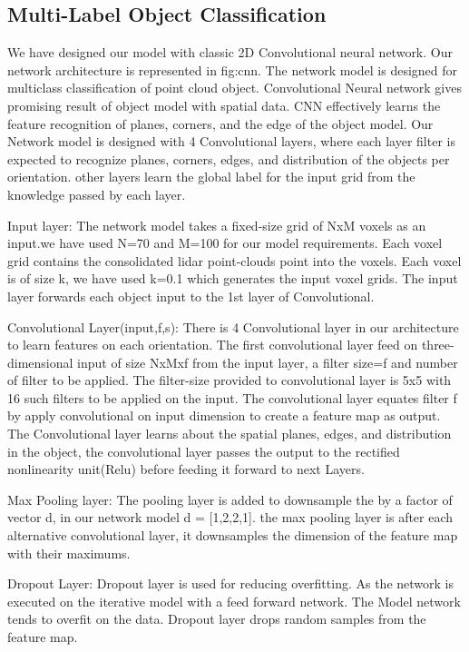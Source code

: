 
\subsection{Multi-Label Object Classification}

We have designed our model with classic 2D Convolutional neural network.
Our network architecture is represented in fig:cnn.
The network model is designed for multiclass classification of point cloud object. Convolutional Neural network gives promising result of object model with spatial data. CNN effectively learns the feature recognition of planes, corners, and the edge of the object model. Our Network model is designed with 4 Convolutional layers, where each layer filter is expected to recognize
planes, corners, edges, and distribution of the objects per orientation.
other layers learn the global label for the input grid from the knowledge passed by each layer.

Input layer:
The network model takes a fixed-size grid of NxM voxels as an input.we have used N=70 and M=100 for our model requirements.
Each voxel grid contains the consolidated lidar point-clouds point into the voxels. Each voxel is of size k, we have used k=0.1
which generates the input voxel grids. The input layer forwards each object input to the 1st layer of Convolutional.


Convolutional Layer(input,f,s):
There is 4 Convolutional layer in our architecture to learn features on each orientation.
The first convolutional layer feed on three-dimensional input of size NxMxf from the input layer, a filter size=f and number of filter to be applied.
The filter-size provided to convolutional layer is 5x5 with 16 such filters to be applied on the input.
The convolutional layer equates filter f by apply convolutional on input dimension to create a feature map as output.
The Convolutional layer learns about the spatial planes, edges, and distribution in the object, the convolutional layer passes the output to the rectified nonlinearity unit(Relu) before feeding it forward to next Layers.

Max Pooling layer:
The pooling layer is added to downsample the by a factor of vector d, in our network model d = [1,2,2,1].
the max pooling layer is after each alternative convolutional layer, it downsamples the dimension of the feature map with their maximums.

Dropout Layer:
Dropout layer is used for reducing overfitting. As the network is executed on the iterative model with a feed forward network.
The Model network tends to overfit on the data. Dropout layer drops random samples from the feature map.

